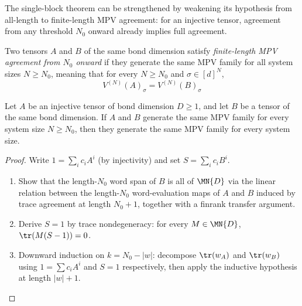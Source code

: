 The single-block theorem can be strengthened by weakening its hypothesis from
all-length to finite-length MPV agreement: for an injective tensor,
agreement from any threshold $N_0$ onward already implies full agreement.

\begin{definition}\label{def:same_mpv_from}
    \leanok
    Two tensors $A$ and $B$ of the same bond dimension satisfy
    \emph{finite-length MPV agreement from $N_0$ onward} if they generate
    the same MPV family for all system sizes $N \ge N_0$, meaning that for
    every $N \ge N_0$ and $\sigma \in [d]^N$,
    \[
        V^{(N)}(A)_\sigma = V^{(N)}(B)_\sigma
    \]
\end{definition}

\begin{theorem}%
    \label{thm:sameMPV_of_sameMPVFrom}
    \leanok
    Let $A$ be an injective tensor of bond dimension $D \ge 1$, and let
    $B$ be a tensor of the same bond dimension. If $A$ and $B$ generate
    the same MPV family for every system size $N \ge N_0$, then they
    generate the same MPV family for every system size.
\end{theorem}

\begin{proof}
    \leanok
    Write $1 = \sum_i c_i A^i$ (by injectivity) and set
    $S = \sum_i c_i B^i$.
    \begin{enumerate}
        \item Show that the length-$N_0$ word span of $B$ is all of
              $\MN{D}$ via the linear relation between the
              length-$N_0$ word-evaluation maps of $A$ and $B$
              induced by trace agreement at length $N_0 + 1$,
              together with a finrank transfer argument.
        \item Derive $S = 1$ by trace nondegeneracy: for every
              $M \in \MN{D}$, $\tr(M(S - 1)) = 0$.
        \item Downward induction on $k = N_0 - |w|$: decompose
              $\tr(w_A)$ and $\tr(w_B)$ using $1 = \sum c_i A^i$
              and $S = 1$ respectively, then apply the inductive
              hypothesis at length $|w| + 1$.
    \end{enumerate}
\end{proof}

